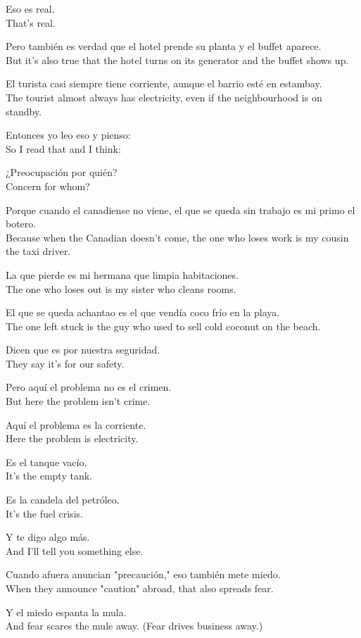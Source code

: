 \documentclass[12pt]{article}
\begin{document}
Eso es real.\\
That's real.

Pero también es verdad que el hotel prende su planta y el buffet aparece.\\
But it's also true that the hotel turns on its generator and the buffet shows up.

El turista casi siempre tiene corriente, aunque el barrio esté en estambay.\\
The tourist almost always has electricity, even if the neighbourhood is on standby.

Entonces yo leo eso y pienso:\\
So I read that and I think:

¿Preocupación por quién?\\
Concern for whom?

Porque cuando el canadiense no viene, el que se queda sin trabajo es mi primo el botero.\\
Because when the Canadian doesn't come, the one who loses work is my cousin the taxi driver.

La que pierde es mi hermana que limpia habitaciones.\\
The one who loses out is my sister who cleans rooms.

El que se queda achantao es el que vendía coco frío en la playa.\\
The one left stuck is the guy who used to sell cold coconut on the beach.

Dicen que es por nuestra seguridad.\\
They say it's for our safety.

Pero aquí el problema no es el crimen.\\
But here the problem isn't crime.

Aquí el problema es la corriente.\\
Here the problem is electricity.

Es el tanque vacío.\\
It's the empty tank.

Es la candela del petróleo.\\
It's the fuel crisis.

Y te digo algo más.\\
And I'll tell you something else.

Cuando afuera anuncian "precaución," eso también mete miedo.\\
When they announce "caution" abroad, that also spreads fear.

Y el miedo espanta la mula.\\
And fear scares the mule away. (Fear drives business away.)
\end{document}
